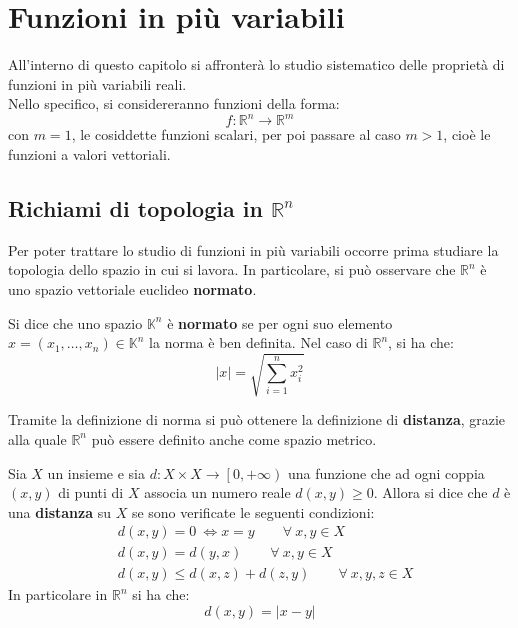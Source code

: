 \chapter{Funzioni in più variabili}
All'interno di questo capitolo si affronterà lo studio sistematico delle proprietà di funzioni in più variabili reali.\\
Nello specifico, si considereranno funzioni della forma: 
\begin{equation}
    f:\mathbb{R}^n \to \mathbb{R}^m
\end{equation}
con $m=1$, le cosiddette funzioni scalari, per poi passare al caso $m>1$, cioè le funzioni a valori vettoriali.
\section{Richiami di topologia in $\mathbb{R}^n$}
Per poter trattare lo studio di funzioni in più variabili occorre prima studiare la topologia dello spazio in cui si lavora.
In particolare, si può osservare che $\mathbb{R}^n$ è uno spazio vettoriale euclideo \textbf{normato}.
\begin{definition}
    Si dice che uno spazio $\mathbb{K}^n$ è \textbf{normato} se per ogni suo elemento $x=(x_1,\dots,x_n) \in \mathbb{K}^n$ la norma è ben definita. Nel caso di $\mathbb{R}^n$, si ha che:
    \begin{equation}
        |x|=\sqrt{\sum\limits_{i=1}^{n}{x_i^2}}
    \end{equation}
\end{definition}
Tramite la definizione di norma si può ottenere la definizione di \textbf{distanza}, grazie alla quale $\mathbb{R}^n$ può essere definito anche come spazio metrico.
\begin{definition}
    Sia $X$ un insieme e sia $d:X \times X \to \left[0, +\infty \right)$ una funzione che ad ogni coppia $(x,y)$ di punti di $X$ associa un numero reale $d(x,y)\geq0$. Allora si dice che $d$ è una \textbf{distanza} su $X$ se sono verificate le seguenti condizioni:
    \begin{align}
        &d(x,y)=0 \ \iff x=y \qquad\forall\ x,y \in X \\
        &d(x,y)=d(y,x) \qquad \forall\ x,y \in X \\
        &d(x,y) \leq d(x,z) + d(z, y) \qquad \forall\ x,y,z \in X
    \end{align}
    In particolare in $\mathbb{R}^n$ si ha che:
    \begin{equation}
        d(x, y)=|x-y|
    \end{equation}
\end{definition}
